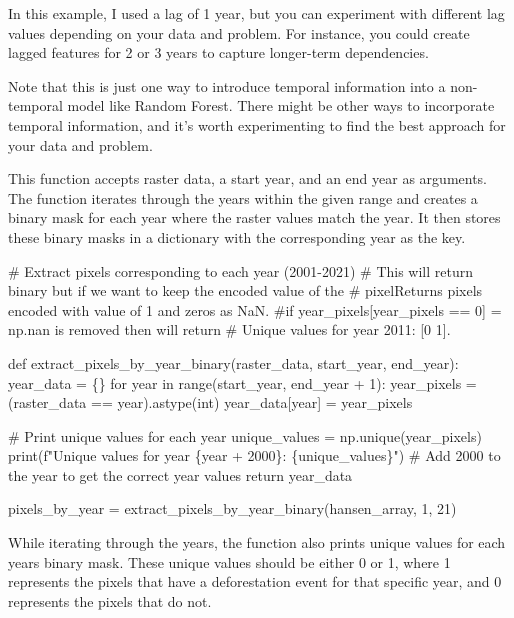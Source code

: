 \documentclass[
  letterpaper,
  DIV=11,
  numbers=noendperiod]{scrartcl}
\newenvironment{Shaded}{\begin{snugshade}}{\end{snugshade}}
\newcommand{\CommentTok}[1]{\textcolor[rgb]{0.37,0.37,0.37}{#1}}
\begin{document}
In this example, I used a lag of 1 year, but you can experiment with
different lag values depending on your data and problem. For instance,
you could create lagged features for 2 or 3 years to capture longer-term
dependencies.

Note that this is just one way to introduce temporal information into a
non-temporal model like Random Forest. There might be other ways to
incorporate temporal information, and it's worth experimenting to find
the best approach for your data and problem.

\begin{Shaded}
\begin{Highlighting}[]
\CommentTok{\textquotesingle{}\textquotesingle{}\textquotesingle{}This function accepts raster data, a start year, and an end year as arguments. }
\CommentTok{The function iterates through the years within the given range and }
\CommentTok{creates a binary mask for each year where the raster values match the year. }
\CommentTok{It then stores these binary masks in a dictionary with the corresponding year }
\CommentTok{as the key.\textquotesingle{}\textquotesingle{}\textquotesingle{}}



\CommentTok{\# Extract pixels corresponding to each year (2001{-}2021)}
\CommentTok{\# This will return binary but if we want to keep the encoded value of the }
\CommentTok{\# pixelReturns pixels encoded with value of 1 and zeros as NaN.}
\CommentTok{\#if \textasciigrave{}year\_pixels[year\_pixels == 0] = np.nan\textasciigrave{} is removed then will return }
\CommentTok{\# Unique values for year 2011: [0 1]. }

\CommentTok{\textquotesingle{}\textquotesingle{}\textquotesingle{}def extract\_pixels\_by\_year\_binary(raster\_data, start\_year, end\_year):}
\CommentTok{    year\_data = \{\}}
\CommentTok{    for year in range(start\_year, end\_year + 1):}
\CommentTok{        year\_pixels = (raster\_data == year).astype(int) }
\CommentTok{        year\_data[year] = year\_pixels}

\CommentTok{        \# Print unique values for each year}
\CommentTok{        unique\_values = np.unique(year\_pixels)}
\CommentTok{        print(f"Unique values for year \{year + 2000\}: \{unique\_values\}") \# Add 2000 to the year to get the correct year values}
\CommentTok{    return year\_data}

\CommentTok{pixels\_by\_year = extract\_pixels\_by\_year\_binary(hansen\_array, 1, 21)\textquotesingle{}\textquotesingle{}\textquotesingle{}}

\CommentTok{\textquotesingle{}\textquotesingle{}\textquotesingle{}While iterating through the years, the function also prints unique values for }
\CommentTok{each year\textquotesingle{}s binary mask. These unique values should be either 0 or 1, }
\CommentTok{where 1 represents the pixels that have a deforestation event }
\CommentTok{for that specific year, and 0 represents the pixels that do not.\textquotesingle{}\textquotesingle{}\textquotesingle{}}


\end{Highlighting}
\end{Shaded}
\end{document}
